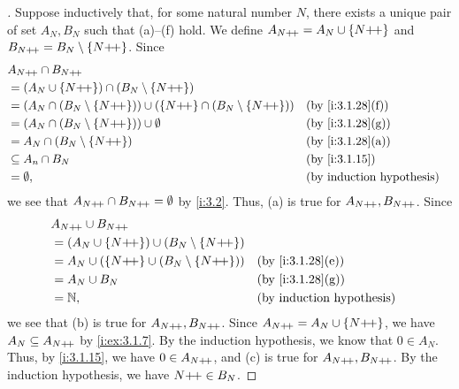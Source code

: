 \begin{proof}[]
  Suppose inductively that, for some natural number \(N\), there exists a unique pair of set \(A_N, B_N\) such that (a)--(f) hold.
  We define \(A_{N{+}\!{+}} = A_N \cup \left\lbrace N{+}\!{+}\right\rbrace\) and \(B_{N{+}\!{+}} = B_N \setminus \left\lbrace N{+}\!{+}\right\rbrace\).
  Since
  \begin{align*}
     & A_{N\pp} \cap B_{N\pp}                                                                                          \\
     & = (A_N \cup \set{N\pp}) \cap (B_N \setminus \set{N\pp})                                                         \\
     & = (A_N \cap (B_N \setminus \set{N\pp})) \cup (\set{N\pp} \cap (B_N \setminus \set{N\pp})) &  & \by{i:3.1.28}[f] \\
     & = (A_N \cap (B_N \setminus \set{N\pp})) \cup \emptyset                                    &  & \by{i:3.1.28}[g] \\
     & = A_N \cap (B_N \setminus \set{N\pp})                                                     &  & \by{i:3.1.28}[a] \\
     & \subseteq A_n \cap B_N                                                                    &  & \by{i:3.1.15}    \\
     & = \emptyset,                                                                              &  & \byIH
  \end{align*}
  we see that \(A_{N{+}\!{+}} \cap B_{N{+}\!{+}} = \emptyset\) by \cref{i:3.2}.
  Thus, (a) is true for \(A_{N{+}\!{+}}, B_{N{+}\!{+}}\).
  Since
  \begin{align*}
     & A_{N\pp} \cup B_{N\pp}                                                        \\
     & = (A_N \cup \set{N\pp}) \cup (B_N \setminus \set{N\pp})                       \\
     & = A_N \cup (\set{N\pp} \cup (B_N \setminus \set{N\pp})) &  & \by{i:3.1.28}[e] \\
     & = A_N \cup B_N                                          &  & \by{i:3.1.28}[g] \\
     & = \N,                                                   &  & \byIH
  \end{align*}
  we see that (b) is true for \(A_{N{+}\!{+}}, B_{N{+}\!{+}}\).
  Since \(A_{N{+}\!{+}} = A_N \cup \left\lbrace N{+}\!{+}\right\rbrace\), we have \(A_N \subseteq A_{N{+}\!{+}}\) by \cref{i:ex:3.1.7}.
  By the induction hypothesis, we know that \(0 \in A_N\).
  Thus, by \cref{i:3.1.15}, we have \(0 \in A_{N{+}\!{+}}\), and (c) is true for \(A_{N{+}\!{+}}, B_{N{+}\!{+}}\).
  By the induction hypothesis, we have \(N{+}\!{+} \in B_N\).

\end{proof}
